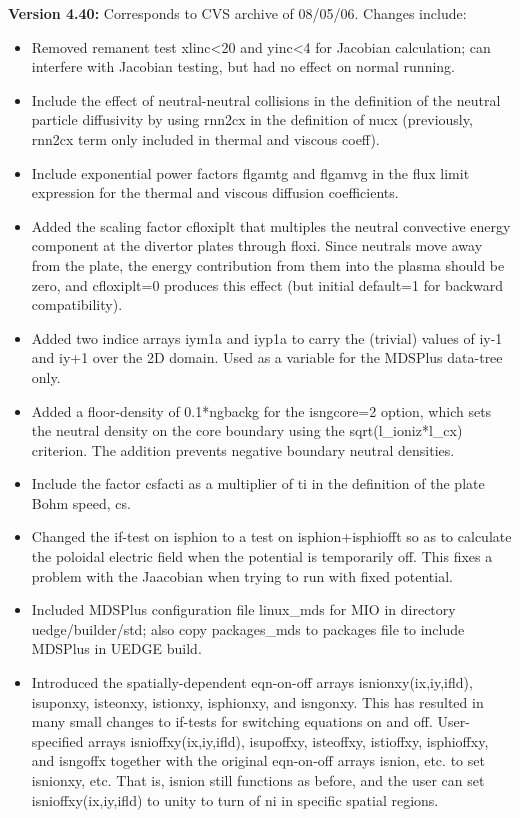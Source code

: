 \documentclass [12pt]{article}
\begin{document}
\noindent\textbf{Version 4.40:} Corresponds to CVS archive of 08/05/06.  
Changes include:
\begin{itemize}
   \item Removed remanent test xlinc<20 and yinc<4 for Jacobian calculation;
         can interfere with Jacobian testing, but had no effect on normal 
	 running.
   \item Include the effect of neutral-neutral collisions in the 
         definition of the neutral particle diffusivity by using 
         rnn2cx in the definition of nucx (previously, rnn2cx term 
	 only included in thermal and viscous coeff).
   \item Include exponential power factors flgamtg and flgamvg in 
	 the flux limit expression for the thermal and viscous 
	 diffusion coefficients.
   \item Added the scaling factor cfloxiplt that multiples the 
  	 neutral convective energy component at the divertor plates 
	 through floxi.  Since neutrals move away from the plate, 
	 the energy contribution from them into the plasma should
	 be zero, and cfloxiplt=0 produces this effect (but initial 
	 default=1 for backward compatibility).
   \item Added two indice arrays iym1a and iyp1a to carry the 
	 (trivial) values of iy-1 and iy+1 over the 2D domain.  
	 Used as a variable for the MDSPlus data-tree only.
   \item Added a floor-density of 0.1*ngbackg for the isngcore=2 
	 option, which sets the neutral density on the core 
	 boundary using the sqrt(l\_ioniz*l\_cx) criterion.  The 
	 addition prevents negative boundary neutral densities.
   \item Include the factor csfacti as a multiplier of ti in the 
	 definition of the plate Bohm speed, cs.
   \item Changed the if-test on isphion to a test on  
	 isphion+isphiofft so as to calculate the poloidal 
	 electric field when the potential is temporarily off.  
	 This fixes a problem with the Jaacobian when trying to 
	 run with fixed potential.
   \item Included MDSPlus configuration file linux\_mds for MIO 
         in directory uedge/builder/std; also copy packages\_mds
	  to packages file to include MDSPlus in UEDGE build.
   \item Introduced the spatially-dependent eqn-on-off arrays 
	 isnionxy(ix,iy,ifld), isuponxy, isteonxy, istionxy, 
	 isphionxy, and isngonxy. This has resulted in many small 
	 changes to if-tests for switching equations on and off.
	 User-specified arrays isnioffxy(ix,iy,ifld), isupoffxy,
	 isteoffxy, istioffxy, isphioffxy, and isngoffx together 
	 with the original eqn-on-off arrays isnion, etc. to set 
	 isnionxy, etc.  That is, isnion still functions as before, 
	 and the user can set isnioffxy(ix,iy,ifld) to unity to
	 turn of ni in specific spatial regions.
\end{itemize}
\end{document}

